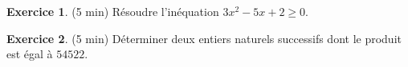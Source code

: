 \documentclass{exam}
\theoremstyle{definition}
\newtheorem{exercice}{Exercice}
\begin{document}
\large


% 
% 


\begin{exercice}{(5 min)}
    Résoudre l'inéquation $3x^2 -5x + 2 \geq 0$.%
\end{exercice}

\begin{exercice}{(5 min)}
    Déterminer deux entiers naturels successifs dont le produit est égal à $54522$.
\end{exercice}

\end{document}
